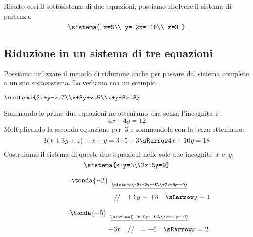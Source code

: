 \begin{soluzione}
Risolto così il sottosistema di due equazioni, possiamo risolvere il 
sistema di partenza:
\[\sistema{
  x=5\\
  y=-2x=-10\\
  z=3
}\]

\end{soluzione}

\subsection{Riduzione in un sistema di tre equazioni}

Possiamo utilizzare il metodo di riduzione anche per  passare dal sistema 
completo a un suo sottosistema. Lo vediamo con un esempio.

 \begin{esempio}{}{}
\(\sistema{3x+y-z=7\\x+3y+z=5\\x+y-3z=3}\)
\vspace{.5em}

\noindent Sommando le prime due equazioni ne otteniamo una senza l'incognita 
\(z\):
\[4x+4y=12\]
Moltiplicando la seconda equazione per~\(3\) e sommandola con la 
terza otteniamo:
\[3(x+3y+z)+x+y=3\cdot 5+3 \sRarrow 4x+10y=18\]
Costruiamo il sistema di queste due equazioni
nelle sole due incognite~\(x\) e~\(y\):
\[\sistema{x+y=3\\2x+5y=9}\]

\hspace{-20mm}
\begin{minipage}{.48\textwidth}
\[\stackrel{
  \begin{array}{l} \cdot \tonda{-2}\\ ~ \end{array}
  \underline{\sistema{-2x-2y=-6\\+2x+5y=+9}}}
  {\qquad \qquad \qquad \qquad 
   ~~~~~~~ // ~~ +3y  =+3 \quad \sRarrow y=1}\]
\end{minipage}
\begin{minipage}{.48\textwidth}
\[\stackrel{
  \begin{array}{l} \cdot \tonda{-5}\\ ~ \end{array}
  \underline{\sistema{-5x-5y=-15\\+2x+5y=+9}}}
  {\qquad \qquad \qquad \qquad 
   ~~~~ -3x ~~~ // ~~ =-6 \quad \sRarrow x=2}\]
\end{minipage}
\vspace{.5em}


\end{esempio}
